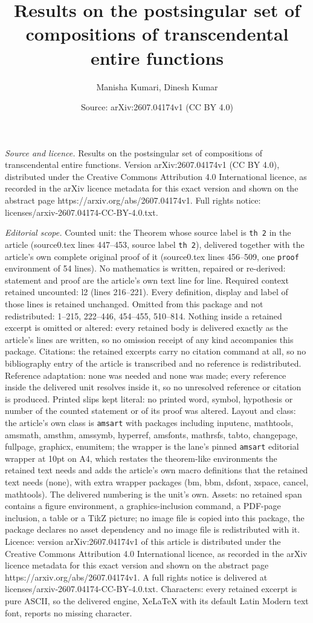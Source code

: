\documentclass[10pt,a4paper]{amsart}
\title[Results on the postsingular set of compositions of transcend]{Results on the postsingular set of compositions of transcendental entire functions}
\author{Manisha Kumari, Dinesh Kumar}
\date{Source: arXiv:2607.04174v1 (CC BY 4.0)}
\begin{document}
\maketitle

\noindent\emph{Source and licence.} Results on the postsingular set of compositions of transcendental entire functions. Version arXiv:2607.04174v1 (CC BY 4.0), distributed under the Creative Commons Attribution 4.0 International licence, as recorded in the arXiv licence metadata for this exact version and shown on the abstract page https://arxiv.org/abs/2607.04174v1. Full rights notice: licenses/arxiv-2607.04174-CC-BY-4.0.txt.\par\smallskip

\noindent\textit{Editorial scope.} Counted unit: the Theorem whose source label is \texttt{th 2} in the article (source0.tex lines 447--453, source label \texttt{th 2}), delivered together with the article's own complete original proof of it (source0.tex lines 456--509, one \texttt{proof} environment of 54 lines). No mathematics is written, repaired or re-derived: statement and proof are the article's own text line for line. Required context retained uncounted: l2 (lines 216--221). Every definition, display and label of those lines is retained unchanged. Omitted from this package and not redistributed: 1--215, 222--446, 454--455, 510--814. Nothing inside a retained excerpt is omitted or altered: every retained body is delivered exactly as the article's lines are written, so no omission receipt of any kind accompanies this package. Citations: the retained excerpts carry no citation command at all, so no bibliography entry of the article is transcribed and no reference is redistributed. Reference adaptation: none was needed and none was made; every reference inside the delivered unit resolves inside it, so no unresolved reference or citation is produced. Printed slips kept literal: no printed word, symbol, hypothesis or number of the counted statement or of its proof was altered. Layout and class: the article's own class is \texttt{amsart} with packages including inputenc, mathtools, amsmath, amsthm, amssymb, hyperref, amsfonts, mathrsfs, tabto, changepage, fullpage, graphicx, enumitem; the wrapper is the lane's pinned \texttt{amsart} editorial wrapper at 10pt on A4, which restates the theorem-like environments the retained text needs and adds the article's own macro definitions that the retained text needs (none), with extra wrapper packages (bm, bbm, dsfont, xspace, cancel, mathtools). The delivered numbering is the unit's own. Assets: no retained span contains a figure environment, a graphics-inclusion command, a PDF-page inclusion, a table or a TikZ picture; no image file is copied into this package, the package declares no asset dependency and no image file is redistributed with it. Licence: version arXiv:2607.04174v1 of this article is distributed under the Creative Commons Attribution 4.0 International licence, as recorded in the arXiv licence metadata for this exact version and shown on the abstract page https://arxiv.org/abs/2607.04174v1. A full rights notice is delivered at licenses/arxiv-2607.04174-CC-BY-4.0.txt. Characters: every retained excerpt is pure ASCII, so the delivered engine, XeLaTeX with its default Latin Modern text font, reports no missing character.
\end{document}
